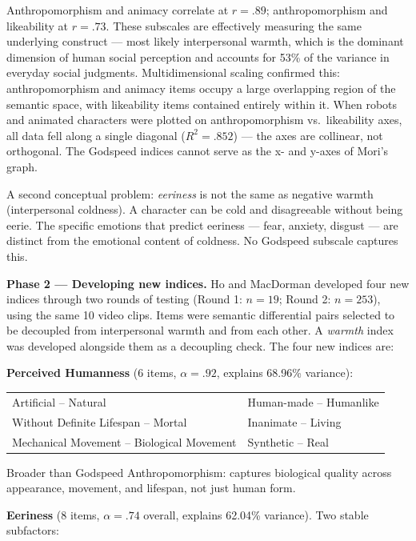 \documentclass[11pt, a4paper]{article}
\begin{document}
Anthropomorphism and animacy correlate at $r = .89$; anthropomorphism and likeability at $r = .73$. These subscales are effectively measuring the same underlying construct --- most likely interpersonal warmth, which is the dominant dimension of human social perception and accounts for 53\% of the variance in everyday social judgments. Multidimensional scaling confirmed this: anthropomorphism and animacy items occupy a large overlapping region of the semantic space, with likeability items contained entirely within it. When robots and animated characters were plotted on anthropomorphism vs.\ likeability axes, all data fell along a single diagonal ($R^{2} = .852$) --- the axes are collinear, not orthogonal. The Godspeed indices cannot serve as the x- and y-axes of Mori's graph.

A second conceptual problem: \textit{eeriness} is not the same as negative warmth (interpersonal coldness). A character can be cold and disagreeable without being eerie. The specific emotions that predict eeriness --- fear, anxiety, disgust --- are distinct from the emotional content of coldness. No Godspeed subscale captures this.

\medskip
\noindent\textbf{Phase 2 --- Developing new indices.} Ho and MacDorman developed four new indices through two rounds of testing (Round 1: $n = 19$; Round 2: $n = 253$), using the same 10 video clips. Items were semantic differential pairs selected to be decoupled from interpersonal warmth and from each other. A \textit{warmth} index was developed alongside them as a decoupling check. The four new indices are:

\medskip
\noindent\textbf{Perceived Humanness} (6 items, $\alpha = .92$, explains 68.96\% variance):

\begin{center}
\small
\begin{tabular}{@{}ll@{}}
Artificial -- Natural & Human-made -- Humanlike \\
Without Definite Lifespan -- Mortal & Inanimate -- Living \\
Mechanical Movement -- Biological Movement & Synthetic -- Real \\
\end{tabular}
\end{center}

Broader than Godspeed Anthropomorphism: captures biological quality across appearance, movement, and lifespan, not just human form.

\medskip
\noindent\textbf{Eeriness} (8 items, $\alpha = .74$ overall, explains 62.04\% variance). Two stable subfactors:
\end{document}
